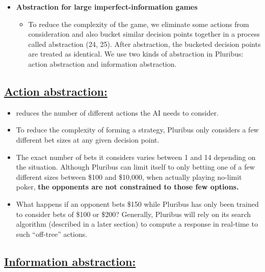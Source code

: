 \documentclass[
]{article}
\begin{document}
\begin{itemize}
\item
  \textbf{Abstraction for large imperfect-information games}

  \begin{itemize}
  \item
    To reduce the complexity of the game, we eliminate some actions from
    consideration and also bucket similar decision points together in a
    process called abstraction (24, 25). After abstraction, the bucketed
    decision points are treated as identical. We use two kinds of
    abstraction in Pluribus: action abstraction and information
    abstraction.
  \end{itemize}
\end{itemize}

\subsection{\texorpdfstring{\textbf{\ul{Action
abstraction:}}}{Action abstraction:}}\label{action-abstraction}

\begin{itemize}
\item
  reduces the number of different actions the AI needs to consider.
\item
  To reduce the complexity of forming a strategy, Pluribus only
  considers a few different bet sizes at any given decision point.
\item
  The exact number of bets it considers varies between 1 and 14
  depending on the situation. Although Pluribus can limit itself to only
  betting one of a few different sizes between \$100 and \$10,000, when
  actually playing no-limit poker, \textbf{the opponents are not
  constrained to those few options.}
\item
  What happens if an opponent bets \$150 while Pluribus has only been
  trained to consider bets of \$100 or \$200? Generally, Pluribus will
  rely on its search algorithm (described in a later section) to compute
  a response in real-time to such ``off-tree'' actions.
\end{itemize}

\subsection{\texorpdfstring{\textbf{\ul{Information
abstraction:}}}{Information abstraction:}}\label{information-abstraction}
\end{document}
